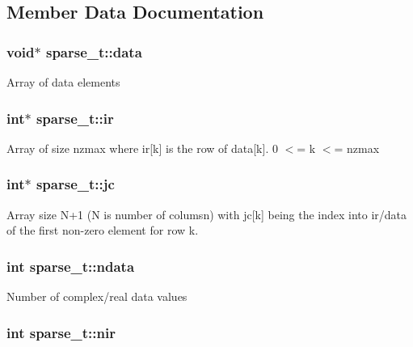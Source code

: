 \subsection{Member Data Documentation}
\hypertarget{structsparse__t_a8194f9468a7d77514db5ed70b54017bb}{
\subsubsection[{data}]{\setlength{\rightskip}{0pt plus 5cm}void$\ast$ {\bf sparse\_\-t::data}}}
\label{structsparse__t_a8194f9468a7d77514db5ed70b54017bb}
Array of data elements \hypertarget{structsparse__t_ae3b4cd31e90bb824e9b00f7c3dec7af4}{
\subsubsection[{ir}]{\setlength{\rightskip}{0pt plus 5cm}int$\ast$ {\bf sparse\_\-t::ir}}}
\label{structsparse__t_ae3b4cd31e90bb824e9b00f7c3dec7af4}
Array of size nzmax where ir\mbox{[}k\mbox{]} is the row of data\mbox{[}k\mbox{]}. 0 $<$= k $<$= nzmax \hypertarget{structsparse__t_aeea61c5d15e5cc015a8baf55cc130ee1}{
\subsubsection[{jc}]{\setlength{\rightskip}{0pt plus 5cm}int$\ast$ {\bf sparse\_\-t::jc}}}
\label{structsparse__t_aeea61c5d15e5cc015a8baf55cc130ee1}
Array size N+1 (N is number of columsn) with jc\mbox{[}k\mbox{]} being the index into ir/data of the first non-\/zero element for row k. \hypertarget{structsparse__t_ab692009004070fda2da8274767a0788d}{
\subsubsection[{ndata}]{\setlength{\rightskip}{0pt plus 5cm}int {\bf sparse\_\-t::ndata}}}
\label{structsparse__t_ab692009004070fda2da8274767a0788d}
Number of complex/real data values \hypertarget{structsparse__t_a6aa1a08cc2760a36771edd65df8cf111}{
\subsubsection[{nir}]{\setlength{\rightskip}{0pt plus 5cm}int {\bf sparse\_\-t::nir}}}
